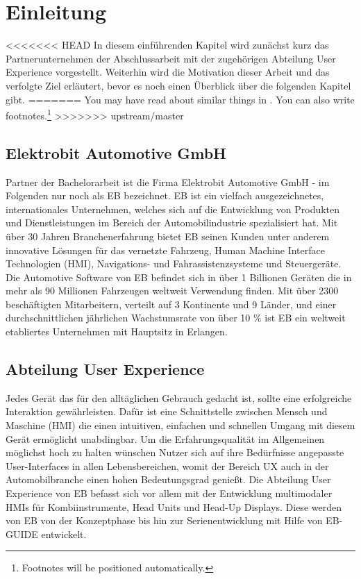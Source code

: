 \chapter{Einleitung}\label{ch:intro}

<<<<<<< HEAD
In diesem einführenden Kapitel wird zunächst kurz das Partnerunternehmen der Abschlussarbeit mit der zugehörigen Abteilung User Experience vorgestellt.
Weiterhin wird die Motivation dieser Arbeit und das verfolgte Ziel erläutert, bevor es noch einen Überblick über die folgenden Kapitel gibt.
=======
You may have read about similar things in \cite{Goodliffe2007}.
You can also write footnotes.\footnote{Footnotes will be positioned automatically.}
\blindtext
>>>>>>> upstream/master

\section{Elektrobit Automotive GmbH}
Partner der Bachelorarbeit ist die Firma Elektrobit Automotive GmbH - im Folgenden nur noch als EB bezeichnet.
EB ist ein vielfach ausgezeichnetes, internationales Unternehmen, welches sich auf die Entwicklung von Produkten und Dienstleistungen im Bereich der Automobilindustrie spezialisiert hat.
Mit über 30 Jahren Branchenerfahrung bietet EB seinen Kunden unter anderem innovative Lösungen für das vernetzte Fahrzeug, Human Machine Interface Technologien (HMI), Navigations- und Fahrassistenzsysteme und Steuergeräte. 
Die Automotive Software von EB befindet sich in über 1 Billionen Geräten die in mehr als 90 Millionen Fahrzeugen weltweit Verwendung finden.
Mit über 2300 beschäftigten Mitarbeitern, verteilt auf 3 Kontinente und 9 Länder, und einer durchschnittlichen jährlichen Wachstumsrate von über 10 \% ist EB ein weltweit etabliertes Unternehmen mit Hauptsitz in Erlangen\cite{about_eb}.

\section{Abteilung User Experience}
Jedes Gerät das für den alltäglichen Gebrauch gedacht ist, sollte eine erfolgreiche Interaktion gewährleisten.
Dafür ist eine Schnittstelle zwischen Mensch und Maschine (HMI) die einen intuitiven, einfachen und schnellen Umgang mit diesem Gerät ermöglicht unabdingbar.
Um die Erfahrungsqualität im Allgemeinen möglichst hoch zu halten wünschen Nutzer sich auf ihre Bedürfnisse angepasste User-Interfaces in allen Lebensbereichen, womit der Bereich UX auch in der Automobilbranche einen hohen Bedeutungsgrad genießt.
Die Abteilung User Experience von EB befasst sich vor allem mit der Entwicklung multimodaler HMIs für Kombiinstrumente, Head Units und Head-Up Displays.
Diese werden von EB von der Konzeptphase bis hin zur Serienentwicklung mit Hilfe von EB-GUIDE entwickelt.


